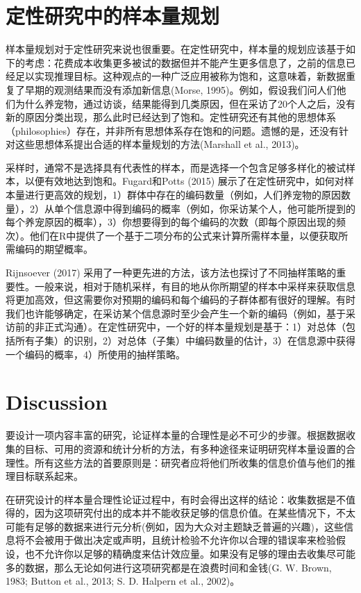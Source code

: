 \documentclass[
  letterpaper,
  DIV=11,
  numbers=noendperiod]{scrreprt}
\begin{document}
\hypertarget{ux5b9aux6027ux7814ux7a76ux4e2dux7684ux6837ux672cux91cfux89c4ux5212}{%
\section{定性研究中的样本量规划}\label{ux5b9aux6027ux7814ux7a76ux4e2dux7684ux6837ux672cux91cfux89c4ux5212}}

样本量规划对于定性研究来说也很重要。在定性研究中，样本量的规划应该基于如下的考虑：花费成本收集更多被试的数据但并不能产生更多信息了，之前的信息已经足以实现推理目标。这种观点的一种广泛应用被称为饱和，这意味着，新数据重复了早期的观测结果而没有添加新信息(Morse,
1995)。例如，假设我们问人们他们为什么养宠物，通过访谈，结果能得到几类原因，但在采访了20个人之后，没有新的原因分类出现，那么此时已经达到了饱和。定性研究还有其他的思想体系（philosophies）存在，并非所有思想体系存在饱和的问题。遗憾的是，还没有针对这些思想体系提出合适的样本量规划的方法(Marshall
et al., 2013)。

采样时，通常不是选择具有代表性的样本，而是选择一个包含足够多样化的被试样本，以便有效地达到饱和。Fugard和Potts
(2015)
展示了在定性研究中，如何对样本量进行更高效的规划，1）群体中存在的编码数量（例如，人们养宠物的原因数量），2）从单个信息源中得到编码的概率（例如，你采访某个人，他可能所提到的每个养宠原因的概率），3）你想要得到的每个编码的次数（即每个原因出现的频次）。他们在R中提供了一个基于二项分布的公式来计算所需样本量，以便获取所需编码的期望概率。

Rijnsoever (2017)
采用了一种更先进的方法，该方法也探讨了不同抽样策略的重要性。一般来说，相对于随机采样，有目的地从你所期望的样本中采样来获取信息将更加高效，但这需要你对预期的编码和每个编码的子群体都有很好的理解。有时我们也许能够确定，在采访某个信息源时至少会产生一个新的编码（例如，基于采访前的非正式沟通）。在定性研究中，一个好的样本量规划是基于：1）对总体（包括所有子集）的识别，2）对总体（子集）中编码数量的估计，3）在信息源中获得一个编码的概率，4）所使用的抽样策略。

\hypertarget{discussion}{%
\section{Discussion}\label{discussion}}

要设计一项内容丰富的研究，论证样本量的合理性是必不可少的步骤。根据数据收集的目标、可用的资源和统计分析的方法，有多种途径来证明研究样本量设置的合理性。所有这些方法的首要原则是：研究者应将他们所收集的信息价值与他们的推理目标联系起来。

在研究设计的样本量合理性论证过程中，有时会得出这样的结论：收集数据是不值得的，因为这项研究付出的成本并不能收获足够的信息价值。在某些情况下，不太可能有足够的数据来进行元分析(例如，因为大众对主题缺乏普遍的兴趣)，这些信息将不会被用于做出决定或声明，且统计检验不允许你以合理的错误率来检验假设，也不允许你以足够的精确度来估计效应量。如果没有足够的理由去收集尽可能多的数据，那么无论如何进行这项研究都是在浪费时间和金钱(G.
W. Brown, 1983; Button et al., 2013; S. D. Halpern et al., 2002)。
\end{document}
